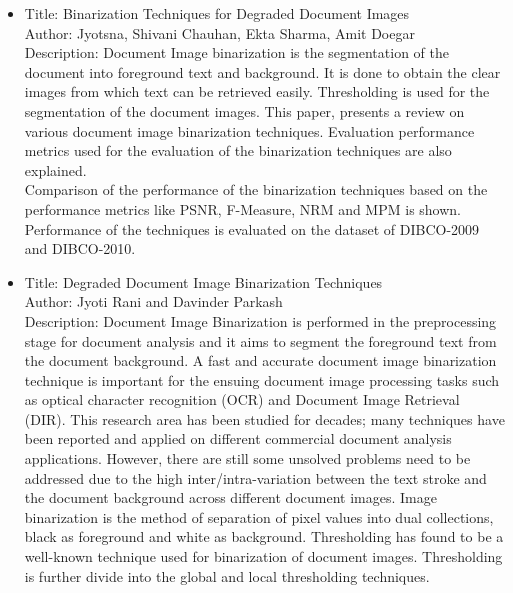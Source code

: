 \documentclass[oneside,a4paper,12pt]{report}
\begin{document}
\begin{itemize}
\item Title: Binarization Techniques for Degraded Document
Images\\
Author: Jyotsna, Shivani Chauhan, Ekta Sharma, Amit Doegar\\
Description: Document Image binarization is the segmentation of the document into foreground text and background. It is done to obtain the clear images from which text can be retrieved easily.
Thresholding is used for the segmentation of the document
images. This paper, presents a review on various document image binarization techniques. Evaluation performance metrics used for the evaluation of the binarization techniques are also explained.\\
Comparison of the performance of the binarization techniques
based on the performance metrics like PSNR, F-Measure, NRM
and MPM is shown. Performance of the techniques is evaluated
on the dataset of DIBCO-2009 and DIBCO-2010.\\

\item Title: Degraded Document Image Binarization Techniques\\
Author: Jyoti Rani and Davinder Parkash \\
Description: Document Image Binarization is performed in the preprocessing stage for document analysis and it aims to segment the foreground text from the document background. A fast and accurate document image binarization technique is
important for the ensuing document image processing tasks such as optical character recognition (OCR) and Document Image Retrieval (DIR). This research area has been studied for decades; many techniques have been reported and applied on different commercial document analysis applications. However, there are still some unsolved problems need to be addressed due to the high inter/intra-variation between the text stroke and the document background across different document images. Image binarization is the method of separation of pixel values into dual collections, black as foreground and white as background. Thresholding has found to be a well-known technique used for binarization of document images. Thresholding is further divide into the global and local thresholding techniques.\\


\end{itemize}
\end{document}
